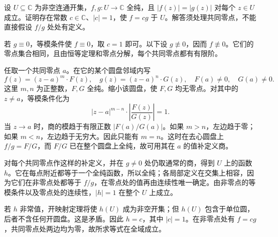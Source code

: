 \begin{exercise}\label{b3:ex:01-equal-modulus}
设 \(U\subseteq\mathbb C\) 为非空连通开集，\(f,g:U\rightarrow\mathbb C\) 全纯，且
\(|f(z)|=|g(z)|\) 对每个 \(z\in U\) 成立。证明存在常数 \(c\in\mathbb C\)、\(|c|=1\)，使 \(f=cg\) 于 \(U\)。解答须处理共同零点，不能直接假设 \(f/g\) 处处有定义。
\end{exercise}
\begin{solution}
若 \(g\equiv0\)，等模条件使 \(f\equiv0\)，取 \(c=1\) 即可。以下设 \(g\not\equiv0\)，因而 \(f\not\equiv0\)。它们的零点集合相同，且由恒等定理和零点分解，每个共同零点都有有限阶。

任取一个共同零点 \(a\)。在它的某个圆盘邻域内写
\[
  f(z)=(z-a)^m\cdot F(z),
  \quad g(z)=(z-a)^n\cdot G(z),
  \quad F(a)\ne0,\quad G(a)\ne0.
\]
这里 \(m,n\) 为正整数，\(F,G\) 全纯。缩小该圆盘，使 \(F,G\) 均无零点。对其中的 \(z\ne a\)，等模条件化为
\[
  |z-a|^{m-n}\cdot\left|\frac{F(z)}{G(z)}\right|=1.
\]
当 \(z\to a\) 时，商的模趋于有限正数 \(|F(a)/G(a)|\)。如果 \(m>n\)，左边趋于零；如果 \(m<n\)，左边趋于无穷大。因此只能有 \(m=n\)。这时在去心圆盘上 \(f/g=F/G\)，而 \(F/G\) 已在整个圆盘上全纯，故可用其在 \(a\) 的值补定义商。

对每个共同零点作这样的补定义，并在 \(g\ne0\) 处仍取通常的商，得到 \(U\) 上的函数 \(h\)。它在每点附近都等于一个全纯函数，所以全纯；各局部定义在交集上相容，因为它们在非零点处都等于 \(f/g\)，在零点处的值再由连续性唯一确定。由非零点的等模条件以及零点处的连续性，\(|h|=1\) 在整个 \(U\) 上成立。

若 \(h\) 非常值，开映射定理将使 \(h(U)\) 成为非空开集；但 \(h(U)\) 包含于单位圆，后者不含任何开圆盘。这是矛盾。因此 \(h=c\)，其中 \(|c|=1\)。在非零点处有 \(f=cg\)，共同零点处两边均为零，故所求等式在全域成立。
\end{solution}

